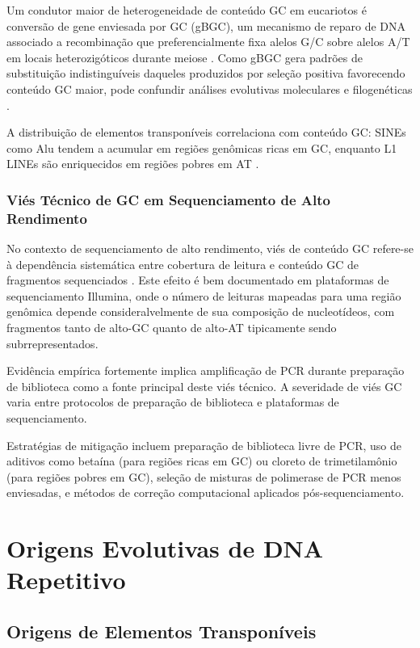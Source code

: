 Um condutor maior de heterogeneidade de conteúdo GC em eucariotos é conversão de gene enviesada por GC (gBGC), um mecanismo de reparo de DNA associado a recombinação que preferencialmente fixa alelos G/C sobre alelos A/T em locais heterozigóticos durante meiose \parencite{galtier2001,eyre-walker1993,duret2009,lassalle2015}. Como gBGC gera padrões de substituição indistinguíveis daqueles produzidos por seleção positiva favorecendo conteúdo GC maior, pode confundir análises evolutivas moleculares e filogenéticas \parencite{romiguier2010}.

A distribuição de elementos transponíveis correlaciona com conteúdo GC: SINEs como Alu tendem a acumular em regiões genômicas ricas em GC, enquanto L1 LINEs são enriquecidos em regiões pobres em AT \parencite{richard2008}.

\subsubsection{Viés Técnico de GC em Sequenciamento de Alto Rendimento}

No contexto de sequenciamento de alto rendimento, viés de conteúdo GC refere-se à dependência sistemática entre cobertura de leitura e conteúdo GC de fragmentos sequenciados \parencite{dohm2008,chen2013,browne2020}. Este efeito é bem documentado em plataformas de sequenciamento Illumina, onde o número de leituras mapeadas para uma região genômica depende consideralvelmente de sua composição de nucleotídeos, com fragmentos tanto de alto-GC quanto de alto-AT tipicamente sendo subrrepresentados.

Evidência empírica fortemente implica amplificação de PCR durante preparação de biblioteca como a fonte principal deste viés técnico. A severidade de viés GC varia entre protocolos de preparação de biblioteca e plataformas de sequenciamento.

Estratégias de mitigação incluem preparação de biblioteca livre de PCR, uso de aditivos como betaína (para regiões ricas em GC) ou cloreto de trimetilamônio (para regiões pobres em GC), seleção de misturas de polimerase de PCR menos enviesadas, e métodos de correção computacional aplicados pós-sequenciamento.

\section{Origens Evolutivas de DNA Repetitivo}

\subsection{Origens de Elementos Transponíveis}

